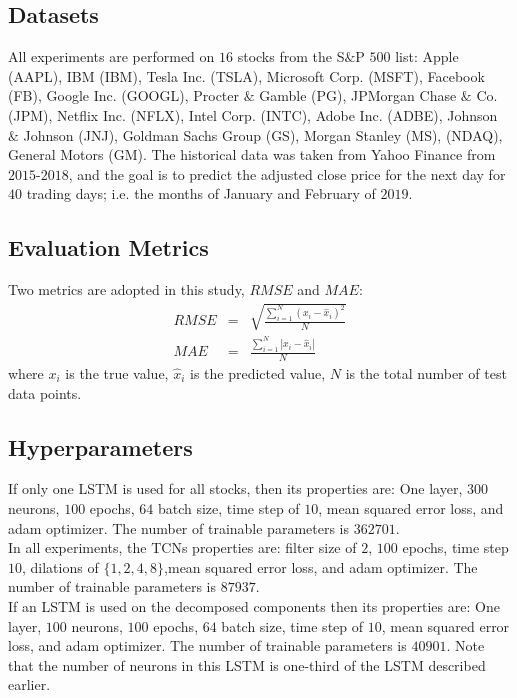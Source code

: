 \documentclass[12pt, A4]{article}
\begin{document}
\subsection{Datasets}
 All experiments are performed on $16$ stocks from the S$\&$P $500$ list: Apple (AAPL), IBM (IBM), Tesla Inc. (TSLA), Microsoft Corp. (MSFT), Facebook (FB), Google Inc. (GOOGL), Procter $\&$ Gamble (PG), JPMorgan Chase $\&$ Co. (JPM), Netflix Inc. (NFLX), Intel Corp. (INTC), Adobe Inc. (ADBE), Johnson $\&$ Johnson (JNJ), Goldman Sachs Group (GS), Morgan Stanley (MS), (NDAQ), General Motors (GM). The historical data was taken from Yahoo Finance from $2015$-$2018$, and the goal is to predict the adjusted close price for the next day for $40$ trading days; i.e. the months of January and February of $2019$. 

\subsection{Evaluation Metrics}
Two metrics are adopted in this study, $RMSE$ and $MAE$:
\begin{eqnarray}
	RMSE &=& \sqrt{\frac{\sum_{i=1}^{N}(x_{i} - \hat{x}_{i})^{2} }{N} } \label{RMSE} \\
	MAE &=& \frac{\sum_{i=1}^{N} |x_{i} - \hat{x}_{i}| }{N} \label{MAE}
\end{eqnarray}
where $x_{i}$ is the true value, $\hat{x}_{i}$ is the predicted value, $N$ is the total number of test data points. 

\subsection{Hyperparameters}

If only one LSTM is used for all stocks, then its properties are: One layer, $300$ neurons, $100$ epochs, $64$ batch size, time step of $10$, mean squared error loss, and adam optimizer. The number of trainable parameters is $362701$. \\

In all experiments, the TCNs properties are: filter size of $2$, $100$ epochs, time step $10$, dilations of $\{1,2,4,8\}$,mean squared error loss, and adam optimizer.  The number of trainable parameters is $87937$. \\

If an LSTM is used on the decomposed components then its properties are: One layer, $100$ neurons, $100$ epochs, $64$ batch size, time step of $10$, mean squared error loss, and adam optimizer. The number of trainable parameters is $40901$.  Note that the number of neurons in this LSTM is one-third of the LSTM described earlier. 
\end{document}
